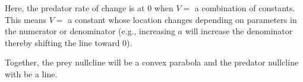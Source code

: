 \documentclass[11pt]{article}
\begin{document}
Here, the predator rate of change is at 0 when $V =$ a combination of constants. This means $V =$ a constant  whose location changes depending on parameters in the numerator or denominator (e.g., increasing $a$ will increase the denominator thereby shifting the line toward 0).

Together, the prey nullcline will be a convex parabola and the predator nullcline with be a line.



    
\end{document}
